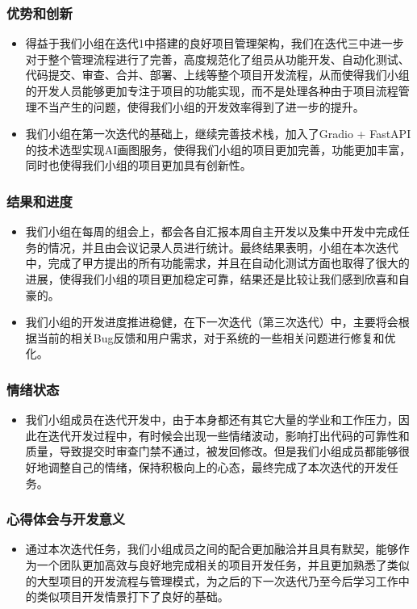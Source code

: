 \begin{frame}
    \frametitle{优势和创新}
    \begin{itemize}
        \item 得益于我们小组在迭代1中搭建的良好项目管理架构，我们在迭代三中进一步对于整个管理流程进行了完善，高度规范化了组员从功能开发、自动化测试、代码提交、审查、合并、部署、上线等整个项目开发流程，从而使得我们小组的开发人员能够更加专注于项目的功能实现，而不是处理各种由于项目流程管理不当产生的问题，使得我们小组的开发效率得到了进一步的提升。
        \item 我们小组在第一次迭代的基础上，继续完善技术栈，加入了Gradio + FastAPI的技术选型实现AI画图服务，使得我们小组的项目更加完善，功能更加丰富，同时也使得我们小组的项目更加具有创新性。
    \end{itemize}
\end{frame}

\begin{frame}
    \frametitle{结果和进度}
    \begin{itemize}
        \item 我们小组在每周的组会上，都会各自汇报本周自主开发以及集中开发中完成任务的情况，并且由会议记录人员进行统计。最终结果表明，小组在本次迭代中，完成了甲方提出的所有功能需求，并且在自动化测试方面也取得了很大的进展，使得我们小组的项目更加稳定可靠，结果还是比较让我们感到欣喜和自豪的。
        \item 我们小组的开发进度推进稳健，在下一次迭代（第三次迭代）中，主要将会根据当前的相关Bug反馈和用户需求，对于系统的一些相关问题进行修复和优化。
    \end{itemize}
\end{frame}

\begin{frame}
    \frametitle{情绪状态}
    \begin{itemize}
        \item 我们小组成员在迭代开发中，由于本身都还有其它大量的学业和工作压力，因此在迭代开发过程中，有时候会出现一些情绪波动，影响打出代码的可靠性和质量，导致提交时审查门禁不通过，被发回修改。但是我们小组成员都能够很好地调整自己的情绪，保持积极向上的心态，最终完成了本次迭代的开发任务。
    \end{itemize}
\end{frame}

\begin{frame}
    \frametitle{心得体会与开发意义}
    \begin{itemize}
        \item 通过本次迭代任务，我们小组成员之间的配合更加融洽并且具有默契，能够作为一个团队更加高效与良好地完成相关的项目开发任务，并且更加熟悉了类似的大型项目的开发流程与管理模式，为之后的下一次迭代乃至今后学习工作中的类似项目开发情景打下了良好的基础。
    \end{itemize}
\end{frame}